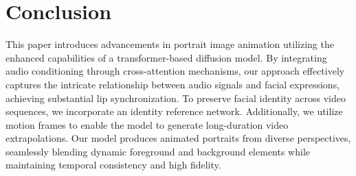 
\section{Conclusion}

This paper introduces advancements in portrait image animation utilizing the enhanced capabilities of a transformer-based diffusion model. By integrating audio conditioning through cross-attention mechanisms, our approach effectively captures the intricate relationship between audio signals and facial expressions, achieving substantial lip synchronization. To preserve facial identity across video sequences, we incorporate an identity reference network. Additionally, we utilize motion frames to enable the model to generate long-duration video extrapolations. Our model produces animated portraits from diverse perspectives, seamlessly blending dynamic foreground and background elements while maintaining temporal consistency and high fidelity.

